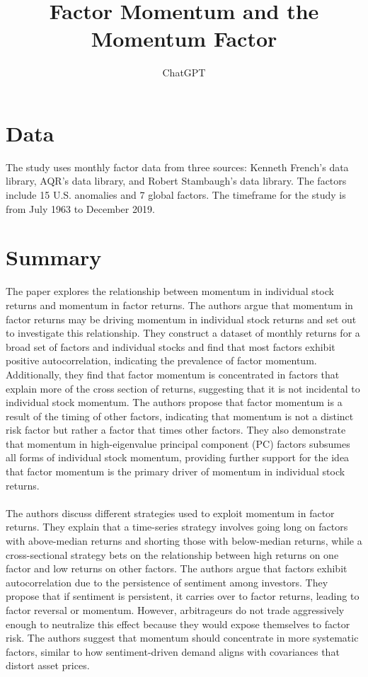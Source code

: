 \documentclass{article}
\title{Factor Momentum and the Momentum Factor}
\author{ChatGPT}
\begin{document}
 

\maketitle
\section{Data}
The study uses monthly factor data from three sources: Kenneth French's data library, AQR's data library, and Robert Stambaugh's data library. The factors include 15 U.S. anomalies and 7 global factors. The timeframe for the study is from July 1963 to December 2019. 
\section{Summary}
The paper explores the relationship between momentum in individual stock returns and momentum in factor returns. The authors argue that momentum in factor returns may be driving momentum in individual stock returns and set out to investigate this relationship. They construct a dataset of monthly returns for a broad set of factors and individual stocks and find that most factors exhibit positive autocorrelation, indicating the prevalence of factor momentum. Additionally, they find that factor momentum is concentrated in factors that explain more of the cross section of returns, suggesting that it is not incidental to individual stock momentum. The authors propose that factor momentum is a result of the timing of other factors, indicating that momentum is not a distinct risk factor but rather a factor that times other factors. They also demonstrate that momentum in high-eigenvalue principal component (PC) factors subsumes all forms of individual stock momentum, providing further support for the idea that factor momentum is the primary driver of momentum in individual stock returns. \\
\\
The authors discuss different strategies used to exploit momentum in factor returns. They explain that a time-series strategy involves going long on factors with above-median returns and shorting those with below-median returns, while a cross-sectional strategy bets on the relationship between high returns on one factor and low returns on other factors. The authors argue that factors exhibit autocorrelation due to the persistence of sentiment among investors. They propose that if sentiment is persistent, it carries over to factor returns, leading to factor reversal or momentum. However, arbitrageurs do not trade aggressively enough to neutralize this effect because they would expose themselves to factor risk. The authors suggest that momentum should concentrate in more systematic factors, similar to how sentiment-driven demand aligns with covariances that distort asset prices. \\
\end{document}
